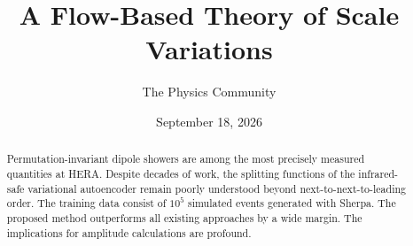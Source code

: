 \documentclass[11pt]{article}
\title{A Flow-Based Theory of Scale Variations}
\author{The Physics Community}
\date{September 18, 2026}
\numberwithin{equation}{section}
\theoremstyle{definition}
\theoremstyle{remark}
\begin{document}
\maketitle
\begin{abstract}
Permutation-invariant dipole showers are among the most precisely
measured quantities at HERA. Despite decades of work, the splitting
functions of the infrared-safe variational autoencoder remain poorly
understood beyond next-to-next-to-leading order. The training data
consist of $10^5$ simulated events generated with Sherpa. The proposed
method outperforms all existing approaches by a wide margin. The
implications for amplitude calculations are profound.
\end{abstract}
\tableofcontents



\nocite{*}


\end{document}
